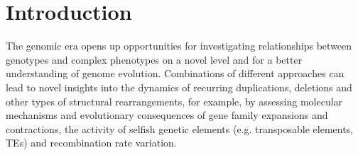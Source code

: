 \documentclass[twocolumn]{bmcart}%
\begin{document}
\begin{frontmatter}
\begin{keyword}
\end{keyword}


%

\end{frontmatter}



\section*{Introduction}
The genomic era opens up opportunities for investigating relationships between genotypes and complex phenotypes on a novel level and for a better understanding of genome evolution. Combinations of different approaches can lead to novel insights into the dynamics of recurring duplications, deletions and other types of structural rearrangements, for example, by assessing molecular mechanisms and evolutionary consequences of gene family expansions and contractions, the activity of selfish genetic elements (e.g. transposable elements, TEs) and recombination rate variation. 
\end{document}
